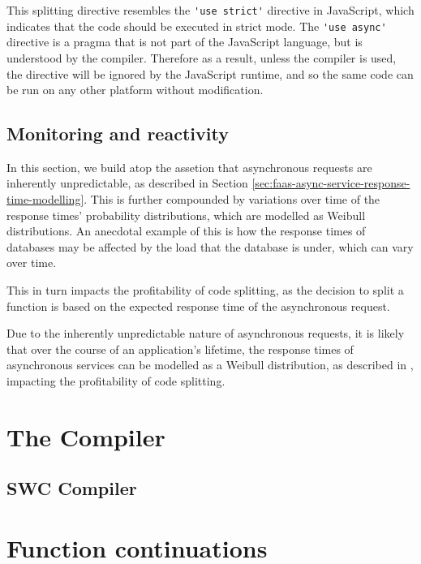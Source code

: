 This splitting directive resembles the \verb|'use strict'| directive in JavaScript, which indicates that the code should be executed in strict mode. The \verb|'use async'| directive is a pragma that is not part of the JavaScript language, but is understood by the \faaasc{} compiler. Therefore as a result, unless the \faaasc{} compiler is used, the directive will be ignored by the JavaScript runtime, and so the same code can be run on any other \faas{} platform without modification.

\subsection{Monitoring and reactivity}
In this section, we build atop the assetion that asynchronous requests are inherently unpredictable, as described in Section \ref{sec:faas-async-service-response-time-modelling}. This is further compounded by variations over time of the response times' probability distributions, which are modelled as Weibull distributions. An anecdotal example of this is how the response times of databases may be affected by the load that the database is under, which can vary over time.

This in turn impacts the profitability of code splitting, as the decision to split a function is based on the expected response time of the asynchronous request.

Due to the inherently unpredictable nature of asynchronous requests, it is likely that over the course of an application's lifetime, the response times of asynchronous services can be modelled as a Weibull distribution, as described in , impacting the profitability of code splitting.


\section{The \faaasc{} Compiler}

\subsection{SWC Compiler}

\section{Function continuations}

